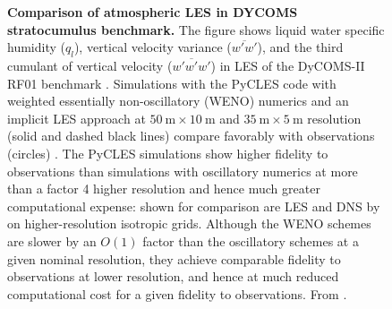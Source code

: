 \documentclass{article}
\begin{document}
\begin{itemize}
\begin{figure}[htb]
      \caption{\textbf{Comparison of atmospheric LES in DYCOMS stratocumulus benchmark.} The figure shows liquid water specific humidity ($q_l$), vertical velocity variance ($\overline{w'w'}$), and the third cumulant of vertical velocity ($\overline{w'w'w'}$) in LES of the DyCOMS-II RF01 benchmark \citep{Stevens03,Stevens05a}. Simulations with the PyCLES code with weighted essentially non-oscillatory (WENO) numerics and an implicit LES approach at $50~\mathrm{m} \times 10~\mathrm{m}$ and $35~\mathrm{m} \times 5~\mathrm{m}$ resolution (solid and dashed black lines) compare favorably with observations (circles) \citep{Pressel15a,Pressel17a}. The PyCLES simulations show higher fidelity to observations than simulations with oscillatory numerics at more than a factor 4 higher resolution and hence much greater computational expense: shown for comparison are LES \citet{Matheou18a} and DNS by \citet{Mellado18a} on higher-resolution isotropic grids. Although the WENO schemes are slower by an $O(1)$ factor than the oscillatory schemes at a given nominal resolution, they achieve comparable fidelity to observations at lower resolution, and hence at much reduced computational cost for a given fidelity to observations. From \citet{Schneider18a}.}\label{f:DYCOMS-test}
 \end{figure}


\end{itemize}
\end{document}
